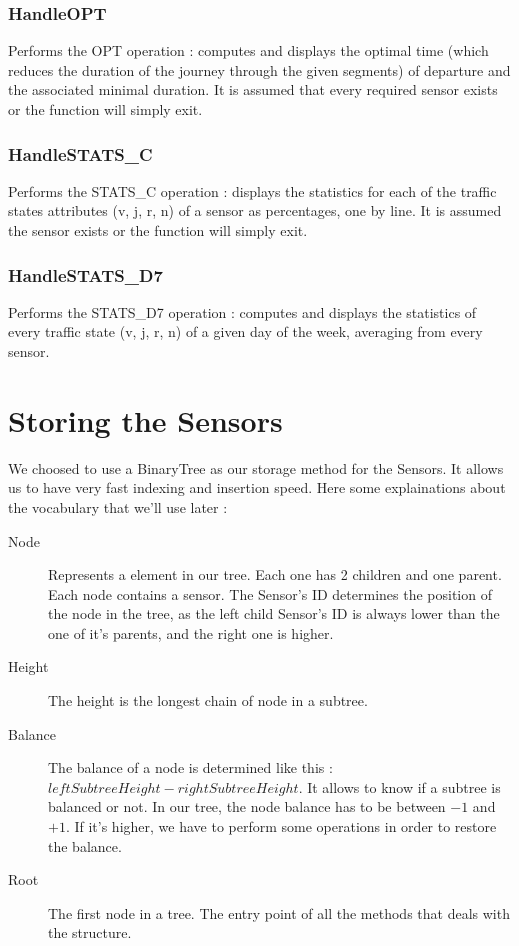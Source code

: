 \documentclass[10pt]{article}
\begin{document}
\subsubsection*{HandleOPT}
Performs the OPT operation : computes and displays the optimal time (which reduces the duration of the journey through the given segments) of departure and the associated minimal duration. It is assumed that every required sensor exists or the function will simply exit.

\subsubsection*{HandleSTATS\_C}
Performs the STATS\_C operation : displays the statistics for each of the traffic states attributes (v, j, r, n) of a sensor as percentages, one by line. It is assumed the sensor exists or the function will simply exit.

\subsubsection*{HandleSTATS\_D7}
Performs the STATS\_D7 operation : computes and displays the statistics of every traffic state (v, j, r, n) of a given day of the week, averaging from every sensor.

\section{Storing the Sensors}
We choosed to use a BinaryTree as our storage method for the Sensors. It allows us to have very fast indexing and insertion speed.
Here some explainations about the vocabulary that we'll use later :
\begin{description}
	\item[Node] Represents a element in our tree. Each one has 2 children and one parent. Each node contains a sensor. The Sensor's ID determines the position of the node in the tree, as the left child Sensor's ID is always lower than the one of it's parents, and the right one is higher.
	\item[Height] The height is the longest chain of node in a subtree.
	\item[Balance] The balance of a node is determined like this : $ leftSubtreeHeight - rightSubtreeHeight$. It allows to know if a subtree is balanced or not. In our tree, the node balance has to be between $-1$ and $+1$. If it's higher, we have to perform some operations in order to restore the balance.
	\item[Root] The first node in a tree. The entry point of all the methods that deals with the structure.
\end{description}
\end{document}
